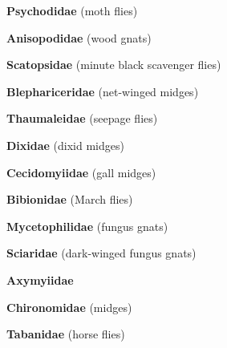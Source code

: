\documentclass[letterpaper,10pt]{article}
\begin{document}
{\makebox[0.6cm]{}  \textbf{Psychodidae} (moth flies) \par
\makebox[0.6cm]{}  \textbf{Anisopodidae} (wood gnats) \par
\makebox[0.6cm]{}  \textbf{Scatopsidae} (minute black scavenger flies) \par
\makebox[0.6cm]{}  \textbf{Blephariceridae} (net-winged midges) \par
\makebox[0.6cm]{}  \textbf{Thaumaleidae} (seepage flies) \par
\makebox[0.6cm]{}  \textbf{Dixidae} (dixid midges) \par
\makebox[0.6cm]{}  \textbf{Cecidomyiidae} (gall midges) \par
\makebox[0.6cm]{}  \textbf{Bibionidae} (March flies) \par
\makebox[0.6cm]{}  \textbf{Mycetophilidae} (fungus gnats) \par
\makebox[0.6cm]{}  \textbf{Sciaridae} (dark-winged fungus gnats) \par
\makebox[0.6cm]{}  \textbf{Axymyiidae} \par
\makebox[0.6cm]{}  \textbf{Chironomidae} (midges) \par
\makebox[0.6cm]{}  \textbf{Tabanidae} (horse flies) \par
}
\end{document}
